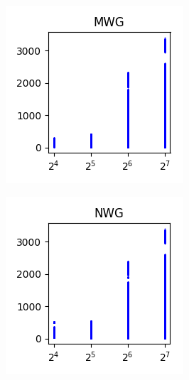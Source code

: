 \documentclass[sigconf,authorversion]{acmart}
\begin{document}
\begin{figure}[htb]
    \centering
    \begin{subfigure}[b]{0.3\textwidth}
        \includegraphics[width=\textwidth]{img/MWG.png}
        \label{fig:mwg}
    \end{subfigure}
%
    \begin{subfigure}[b]{0.3\textwidth}
        \includegraphics[width=\textwidth]{img/NWG.png}

\end{subfigure}
\end{figure}
\end{document}
